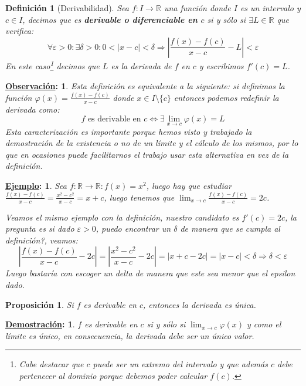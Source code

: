 \documentclass[10pt,a4paper,openright]{book}
\theoremstyle{break}
\newtheorem*{defi}{Definición}
\newtheorem*{prop}{Proposición}
\newtheorem*{demo}{\underline{Demostración}:}
\newtheorem*{obs}{\underline{Observación}:}
\newtheorem*{ej}{\underline{Ejemplo}:}
\begin{document}
\begin{defi}[Derivabilidad]
Sea $f: I\rightarrow \mathbb R$ una función donde $I$ es un intervalo y $c\in I$, decimos que es \textbf{derivable o diferenciable en $c$} si y sólo si $\exists L\in \mathbb R$ que verifica:
$$\forall \varepsilon>0: \exists \delta>0 : 0<|x-c|<\delta\Rightarrow \left|\frac{f(x)-f(c)}{x-c}-L\right|<\varepsilon$$
En este caso\footnote{Cabe destacar que $c$ puede ser un extremo del intervalo y que además $c$ debe pertenecer al dominio porque debemos poder calcular $f(c)$.} decimos que $L$ es la derivada de $f$ en $c$ y escribimos $f'(c)=L$.
\end{defi}

\begin{obs}
Esta definición es equivalente a la siguiente: si definimos la función $\varphi(x) = \frac{f(x)-f(c)}{x-c}$ donde $x\in I\mbox{\textbackslash}\{c\}$ entonces podemos redefinir la derivada como:
$$f\mbox{ es derivable en }c\Leftrightarrow \exists \lim_{x\rightarrow c}\varphi(x) = L$$
Esta caracterización es importante porque hemos visto y trabajado la demostración de la existencia o no de un límite y el cálculo de los mismos, por lo que en ocasiones puede facilitarnos el trabajo usar esta alternativa en vez de la definición.
\end{obs}

\begin{ej}
Sea $f: \mathbb R \rightarrow \mathbb R: f(x)=x^2$, luego hay que estudiar $\frac{f(x)-f(c)}{x-c} = \frac{x^2- c^2}{x-c}= x+c$, luego tenemos que $\lim_{x\rightarrow c} \frac{f(x)-f(c)}{x-c}= 2c$.\par
Veamos el mismo ejemplo con la definición, nuestro candidato es $f'(c)=2c$, la pregunta es si dado $\varepsilon>0$, puedo encontrar un $\delta$ de manera que se cumpla al definición?, veamos:
$$\left|\frac{f(x)-f(c)}{x-c}-2c\right| = \left|\frac{x^2-c^2}{x-c}-2c\right| = |x+c-2c|= |x-c|<\delta \Rightarrow \delta <\varepsilon$$
Luego bastaría con escoger un delta de manera que este sea menor que el epsilon dado.
\end{ej}

\begin{prop}
Si $f$ es derivable en $c$, entonces la derivada es única.
\end{prop}
\begin{demo}
$f$ es derivable en $c$ si y sólo si $\lim_{x\rightarrow c}\varphi(x) $ y como el límite es único, en consecuencia, la derivada debe ser un único valor.
\end{demo}
\end{document}
